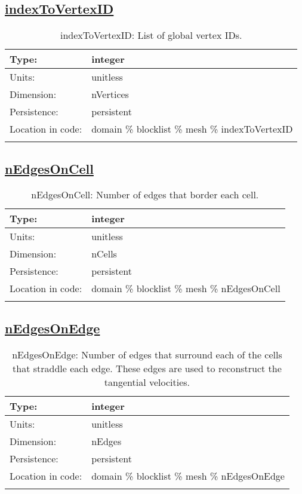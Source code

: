\subsection[indexToVertexID]{\hyperref[sec:var_tab_mesh]{indexToVertexID}}
\label{subsec:var_sec_mesh_indexToVertexID}
\begin{center}
\begin{longtable}{| p{2.0in} | p{4.0in} |}
        \hline 
        Type: & integer \\
        \hline 
        Units: & \si{unitless} \\
        \hline 
        Dimension: & nVertices \\
        \hline 
        Persistence: & persistent \\
        \hline 
         Location in code: & domain \% blocklist \% mesh \% indexToVertexID \\
         \hline 
    \caption{indexToVertexID: List of global vertex IDs.}
\end{longtable}
\end{center}
\subsection[nEdgesOnCell]{\hyperref[sec:var_tab_mesh]{nEdgesOnCell}}
\label{subsec:var_sec_mesh_nEdgesOnCell}
\begin{center}
\begin{longtable}{| p{2.0in} | p{4.0in} |}
        \hline 
        Type: & integer \\
        \hline 
        Units: & \si{unitless} \\
        \hline 
        Dimension: & nCells \\
        \hline 
        Persistence: & persistent \\
        \hline 
         Location in code: & domain \% blocklist \% mesh \% nEdgesOnCell \\
         \hline 
    \caption{nEdgesOnCell: Number of edges that border each cell.}
\end{longtable}
\end{center}
\subsection[nEdgesOnEdge]{\hyperref[sec:var_tab_mesh]{nEdgesOnEdge}}
\label{subsec:var_sec_mesh_nEdgesOnEdge}
\begin{center}
\begin{longtable}{| p{2.0in} | p{4.0in} |}
        \hline 
        Type: & integer \\
        \hline 
        Units: & \si{unitless} \\
        \hline 
        Dimension: & nEdges \\
        \hline 
        Persistence: & persistent \\
        \hline 
         Location in code: & domain \% blocklist \% mesh \% nEdgesOnEdge \\
         \hline 
    \caption{nEdgesOnEdge: Number of edges that surround each of the cells that straddle each edge. These edges are used to reconstruct the tangential velocities.}
\end{longtable}
\end{center}
